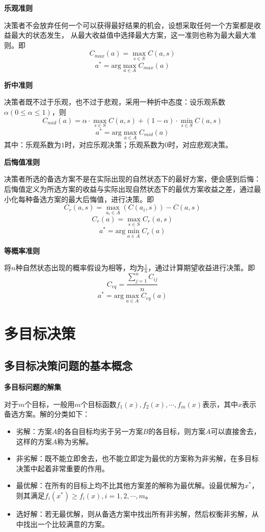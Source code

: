\documentclass[a4paper,12pt]{article}
\begin{document}
\noindent
\textbf{乐观准则}
 
决策者不会放弃任何一个可以获得最好结果的机会，设想采取任何一个方案都是收益最大的状态发生，
从最大收益值中选择最大方案，这一准则也称为最大最大准则。即
$$
C_{max}\left(a\right)=\max_{s\in S}C\left(a,s\right)$$
$$
a^*=\text{arg}\max_{a\in A}C_{max}\left(a\right)
$$

\noindent
\textbf{折中准则}
 
决策者既不过于乐观，也不过于悲观，采用一种折中态度：设乐观系数$\alpha(0\le\alpha\le 1)$，则
$$
C_{mid}\left(a\right)=\alpha\cdot\max_{s\in S}C\left(a,s\right)+\left(1-\alpha\right)\cdot\min_{s\in S}C\left(a,s\right)
$$
$$
a^*=\text{arg}\max_{a\in A}C_{mid}\left(a\right)
$$
其中：乐观系数为$1$时，对应乐观决策；乐观系数为$0$时，对应悲观决策。

\noindent
\textbf{后悔值准则}

决策者所选的备选方案不是在实际出现的自然状态下的最好方案，便会感到后悔：
后悔值定义为所选方案的收益与实际出现自然状态下的最优方案收益之差，通过最小化每种备选方案的最大后悔值，进行决策。即
$$
C_r\left(a,s\right)=\max_{a_i\in A}\left(C\left(a_i,s\right)\right)-C\left(a,s\right)
$$
$$
C_r\left(a\right)=\max_{s\in S}C_r\left(a,s\right)
$$
$$
a^*=\text{arg}\min_{a\in A}C_r\left(a\right)
$$

\noindent
\textbf{等概率准则}

将$n$种自然状态出现的概率假设为相等，均为$\frac{1}{n}$，通过计算期望收益进行决策。即
$$
C_{eq}=\frac{\sum_{j=1}^nC_{ij}}{n}
$$
$$
a^*=\text{arg}\max_{a\in A}C_{eq}\left(a\right)
$$

\section{多目标决策}

\subsection{多目标决策问题的基本概念}

\noindent
\textbf{多目标问题的解集}

对于$m$个目标，一般用$m$个目标函数$f_1(x),f_2(x),\cdots,f_m(x)$表示，其中$x$表示备选方案。解的分类如下：
\begin{itemize}[itemsep=0pt,parsep=0pt]
    \item 劣解：方案$A$的各自目标均劣于另一方案$B$的各目标，则方案$A$可以直接舍去，这样的方案$A$称为劣解。
    \item 非劣解：既不能立即舍去，也不能立即定为最优的方案称为非劣解，在多目标决策中起着非常重要的作用。
    \item 最优解：在所有的目标上均不比其他方案差的解称为最优解。设最优解为$x^*$，则其满足$f_i(x^*)\ge f_i(x),i=1,2,\cdots,m$。
    \item 选好解：若无最优解，则从备选方案中找出所有非劣解，然后权衡非劣解，从中找出一个比较满意的方案。
\end{itemize}
\end{document}
